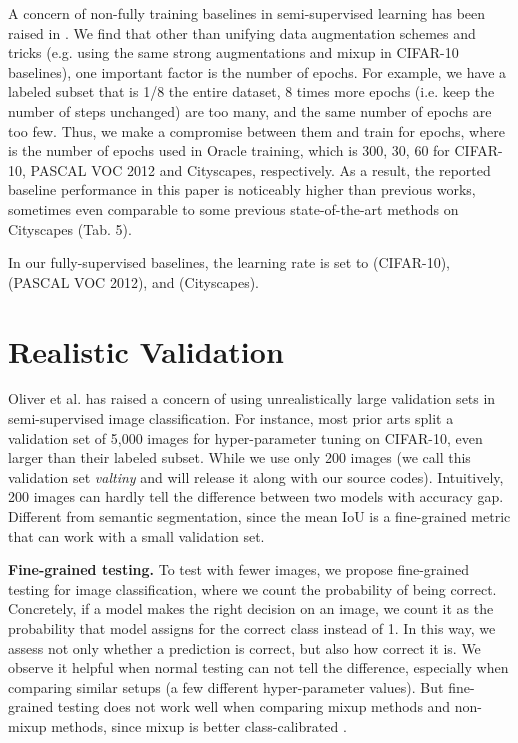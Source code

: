 \documentclass[preprint,review,10pt]{elsarticle}
\begin{document}
A concern of non-fully training baselines in semi-supervised learning has been raised in \cite{oliver2018realistic}. We find that other than unifying data augmentation schemes and tricks (e.g. using the same strong augmentations and mixup in CIFAR-10 baselines), one important factor is the number of epochs. For example, we have a labeled subset that is 1/8 the entire dataset, 8 times more epochs (i.e. keep the number of steps unchanged) are too many, and the same number of epochs are too few. Thus, we make a compromise between them and train for  epochs, where  is the number of epochs used in Oracle training, which is 300, 30, 60 for CIFAR-10, PASCAL VOC 2012 and Cityscapes, respectively. As a result, the reported baseline performance in this paper is noticeably higher than previous works, sometimes even comparable to some previous state-of-the-art methods on Cityscapes (Tab. 5).

In our fully-supervised baselines, the learning rate is set to  (CIFAR-10),  (PASCAL VOC 2012), and  (Cityscapes).

\section{Realistic Validation}
\label{sec:a4}

Oliver et al. \cite{oliver2018realistic} has raised a concern of using unrealistically large validation sets in semi-supervised image classification. For instance, most prior arts split a validation set of 5,000 images for hyper-parameter tuning on CIFAR-10, even larger than their labeled subset. While we use only 200 images (we call this validation set \textit{valtiny} and will release it along with our source codes). Intuitively, 200 images can hardly tell the difference between two models with  accuracy gap. Different from semantic segmentation, since the mean IoU is a fine-grained metric that can work with a small validation set.

\textbf{Fine-grained testing.} To test with fewer images, we propose fine-grained testing for image classification, where we count the probability of being correct. Concretely, if a model makes the right decision on an image, we count it as the probability that model assigns for the correct class instead of 1. In this way, we assess not only whether a prediction is correct, but also how correct it is. We observe it helpful when normal testing can not tell the difference, especially when comparing similar setups (a few different hyper-parameter values). But fine-grained testing does not work well when comparing mixup methods and non-mixup methods, since mixup is better class-calibrated \cite{thulasidasan2019mixup}.




























 

\end{document}
